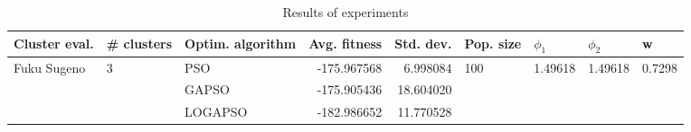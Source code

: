 \begin{table}
\centering
\caption{Results of experiments}
\begin{tabular}{lllrrllll}
\toprule
               Cluster eval. &        \# clusters & Optim. algorithm &  Avg. fitness &  Std. dev. &            Pop. size &               $\phi_{1}$ &               $\phi_{2}$ &                       w \\
\midrule
\multirow{3}{*}{Fuku Sugeno} & \multirow{3}{*}{3} &              PSO &   -175.967568 &   6.998084 & \multirow{3}{*}{100} & \multirow{3}{*}{1.49618} & \multirow{3}{*}{1.49618} & \multirow{3}{*}{0.7298} \\
                             &                    &            GAPSO &   -175.905436 &  18.604020 &                      &                          &                          &                         \\
                             &                    &          LOGAPSO &   -182.986652 &  11.770528 &                      &                          &                          &                         \\
\bottomrule
\end{tabular}
\end{table}
